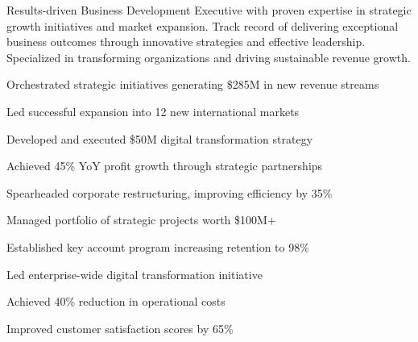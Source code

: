 \documentclass[withhyper]{gamifiedcv}
\begin{document}
\begin{paracol}{2}

Results-driven Business Development Executive with proven expertise in strategic growth 
initiatives and market expansion. Track record of delivering exceptional business outcomes 
through innovative strategies and effective leadership. Specialized in transforming 
organizations and driving sustainable revenue growth.


\begin{jobdescription}
    \item Orchestrated strategic initiatives generating \$285M in new revenue streams
    \item Led successful expansion into 12 new international markets
    \item Developed and executed \$50M digital transformation strategy
    \item Achieved 45\% YoY profit growth through strategic partnerships
\end{jobdescription}

\begin{jobdescription}
    \item Spearheaded corporate restructuring, improving efficiency by 35\%
    \item Managed portfolio of strategic projects worth \$100M+
    \item Established key account program increasing retention to 98\%
\end{jobdescription}


\begin{jobdescription}
    \item Led enterprise-wide digital transformation initiative
    \item Achieved 40\% reduction in operational costs
    \item Improved customer satisfaction scores by 65\%
\end{jobdescription}



\end{paracol}
\end{document}
